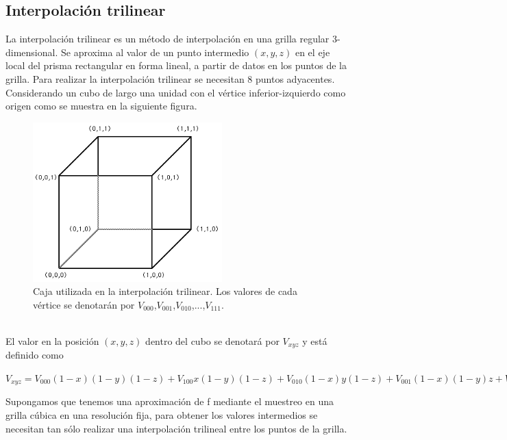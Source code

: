 \documentclass[12pt]{article}
\begin{document}
\subsection{Interpolación trilinear}
La interpolación trilinear\cite{inter} es un método de interpolación en una grilla regular 3-dimensional. Se aproxima al valor de un punto intermedio $(x, y, z)$ en el eje local del prisma rectangular en forma lineal, a partir de datos en los puntos de la grilla. Para realizar la interpolación trilinear se necesitan 8 puntos adyacentes.
Considerando un cubo de largo una unidad con el vértice inferior-izquierdo como origen como se muestra en la siguiente figura.
\begin{figure}[h!]
\includegraphics[width=0.65\textwidth,center]{inter.png}
\caption{Caja utilizada en la interpolación trilinear. Los valores de cada vértice se denotarán por $V_{000}$,$V_{001}$,$V_{010}$,...,$V_{111}$.}
\end{figure}
\\El valor en la posición $(x,y,z)$ dentro del cubo se denotará por $V_{xyz}$ y está definido como
\begin{center}
$V_{xyz}=V_{000}(1-x)(1-y)(1-z) + V_{100}x(1-y)(1-z) + V_{010}(1-x)y(1-z) + V_{001}(1-x)(1-y)z + V_{101}x(1-y)z + V_{011}(1-x)yz + V_{110}xy(1-z) + V_{111}xyz$
\end{center}
Supongamos que tenemos una aproximación de f mediante el muestreo en una grilla cúbica en una resolución fija, para obtener los valores intermedios se necesitan tan sólo realizar una interpolación trilineal entre los puntos de la grilla.
\end{document}
